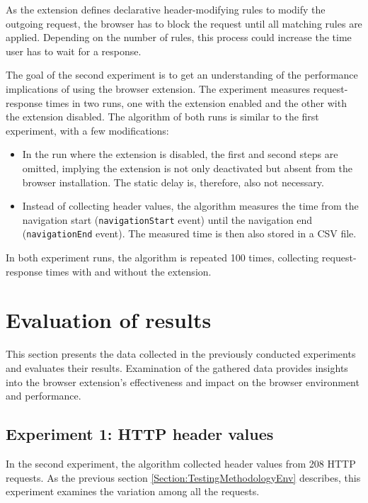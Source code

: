 As the extension defines declarative header-modifying rules to modify the outgoing request, the browser has to block the request until all matching rules are applied. Depending on the number of rules, this process could increase the time user has to wait for a response.

The goal of the second experiment is to get an understanding of the performance implications of using the browser extension. The experiment measures request-response times in two runs, one with the extension enabled and the other with the extension disabled. The algorithm of both runs is similar to the first experiment, with a few modifications:

\begin{itemize}
	\item In the run where the extension is disabled, the first and second steps are omitted, implying the extension is not only deactivated but absent from the browser installation. The static delay is, therefore, also not necessary.
	\item Instead of collecting header values, the algorithm measures the time from the navigation start (\texttt{navigationStart} event) until the navigation end (\texttt{navigationEnd} event). The measured time is then also stored in a CSV file.
\end{itemize}

In both experiment runs, the algorithm is repeated 100 times, collecting request-response times with and without the extension.

\section{Evaluation of results}

This section presents the data collected in the previously conducted experiments and evaluates their results. Examination of the gathered data provides insights into the browser extension's effectiveness and impact on the browser environment and performance.

\subsection{Experiment 1: HTTP header values}

In the second experiment, the algorithm collected header values from 208 HTTP requests. As the previous section \ref{Section:TestingMethodologyEnv} describes, this experiment examines the variation among all the requests.

